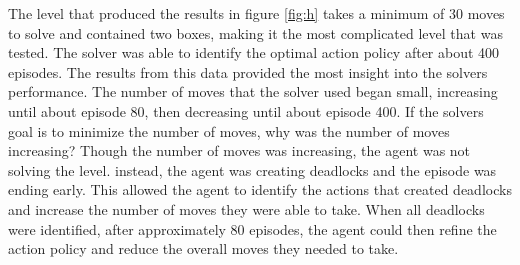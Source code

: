 \documentclass[times, 10pt,twocolumn]{article}
\begin{document}
The level that produced the results in figure \ref{fig:h} takes a minimum of 30 moves to solve and contained two boxes, making it the most complicated level that was tested. The solver was able to identify the optimal action policy after about 400 episodes. The results from this data provided the most insight into the solvers performance. The number of moves that the solver used began small, increasing until about episode 80, then decreasing until about episode 400. If the solvers goal is to minimize the number of moves, why was the number of moves increasing? Though the number of moves was increasing, the agent was not solving the level. instead, the agent was creating deadlocks and the episode was ending early. This allowed the agent to identify the actions that created deadlocks and increase the number of moves they were able to take. When all deadlocks were identified, after approximately 80 episodes, the agent could then refine the action policy and reduce the overall moves they needed to take.


\appendix
\listoffigures
\listoftables



\end{document}
